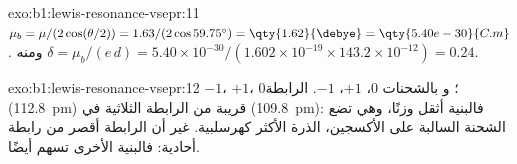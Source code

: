 \begin{solution}{exo:b1:lewis-resonance-vsepr:11}
$\mu_b = \mu/(2\cos(\theta/2)) = 1.63/(2\cos 59.75^\circ) =
\qty{1.62}{\debye} = \qty{5.40e-30}{C.m}$. ومنه $\delta = \mu_b/(e\,d) =
5.40 \times 10^{-30}/(1.602 \times 10^{-19} \times 143.2 \times 10^{-12})
= 0.24$.
\end{solution}

\begin{solution}{exo:b1:lewis-resonance-vsepr:12}
  $-1$، $+1$، $0$؛ و بالشحنات $0$،
$+1$، $-1$. الرابطة  (\qty{112.8}{pm}) قريبة من الرابطة
الثلاثية في  (\qty{109.8}{pm}): فالبنية  أثقل وزنًا،
وهي تضع الشحنة السالبة على الأكسجين، الذرة الأكثر
كهرسلبية. غير أن الرابطة  أقصر من رابطة أحادية: فالبنية
الأخرى تسهم أيضًا.
\end{solution}

